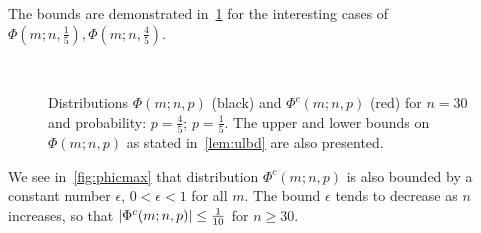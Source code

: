 \documentclass[pra,
aps,
twocolumn,
superscriptaddress,
groupedaddress,
nofootinbib,
reprint
]{revtex4-1}
\begin{document}
The bounds are demonstrated in~\cref{fig:phi} for the interesting cases of $\Phi\left(m;n,\frac{1}{5}\right),\Phi\left(m;n,\frac{4}{5}\right)$.

\begin{figure}%
    \centering
    \\%
    \caption{Distributions $\Phi(m;n,p)$ (black) and $\Phi^c(m;n,p)$ (red) for $n=30$ and probability: 
     $p=\frac{4}{5}$;  $p=\frac{1}{5}$.
    The upper and lower bounds on $\Phi(m;n,p)$ as stated in~\cref{lem:ulbd} are also presented. 
    }%
    \label{fig:phi}
\end{figure}

We see in~\cref{fig:phicmax} that distribution $\Phi^c(m;n,p)$ is also bounded by a constant number $\epsilon$, $0<\epsilon<1$ for all $m$.
The bound $\epsilon$ tends to decrease as $n$ increases, so that $\abs{\Phi^c(m;n,p)} \leq \frac{1}{10}$ for $n\geq 30$.
\end{document}
